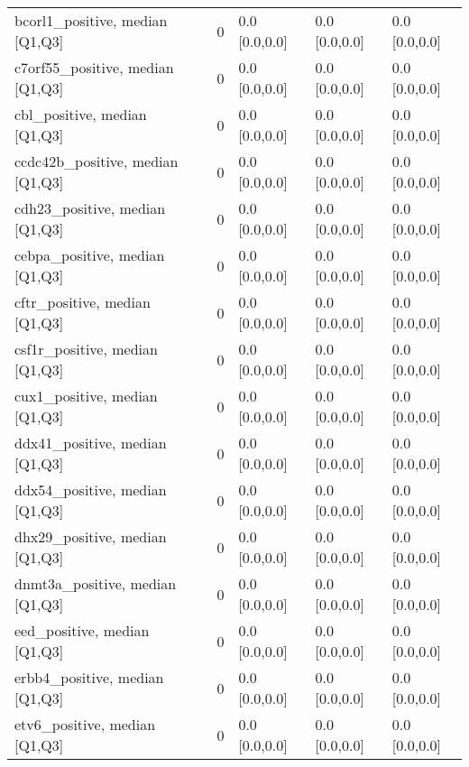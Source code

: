 \begin{tabular}{llllll}
bcorl1\_positive, median [Q1,Q3] &     &                    0 &       0.0 [0.0,0.0] &       0.0 [0.0,0.0] &     0.0 [0.0,0.0] \\
c7orf55\_positive, median [Q1,Q3] &     &                    0 &       0.0 [0.0,0.0] &       0.0 [0.0,0.0] &     0.0 [0.0,0.0] \\
cbl\_positive, median [Q1,Q3] &     &                    0 &       0.0 [0.0,0.0] &       0.0 [0.0,0.0] &     0.0 [0.0,0.0] \\
ccdc42b\_positive, median [Q1,Q3] &     &                    0 &       0.0 [0.0,0.0] &       0.0 [0.0,0.0] &     0.0 [0.0,0.0] \\
cdh23\_positive, median [Q1,Q3] &     &                    0 &       0.0 [0.0,0.0] &       0.0 [0.0,0.0] &     0.0 [0.0,0.0] \\
cebpa\_positive, median [Q1,Q3] &     &                    0 &       0.0 [0.0,0.0] &       0.0 [0.0,0.0] &     0.0 [0.0,0.0] \\
cftr\_positive, median [Q1,Q3] &     &                    0 &       0.0 [0.0,0.0] &       0.0 [0.0,0.0] &     0.0 [0.0,0.0] \\
csf1r\_positive, median [Q1,Q3] &     &                    0 &       0.0 [0.0,0.0] &       0.0 [0.0,0.0] &     0.0 [0.0,0.0] \\
cux1\_positive, median [Q1,Q3] &     &                    0 &       0.0 [0.0,0.0] &       0.0 [0.0,0.0] &     0.0 [0.0,0.0] \\
ddx41\_positive, median [Q1,Q3] &     &                    0 &       0.0 [0.0,0.0] &       0.0 [0.0,0.0] &     0.0 [0.0,0.0] \\
ddx54\_positive, median [Q1,Q3] &     &                    0 &       0.0 [0.0,0.0] &       0.0 [0.0,0.0] &     0.0 [0.0,0.0] \\
dhx29\_positive, median [Q1,Q3] &     &                    0 &       0.0 [0.0,0.0] &       0.0 [0.0,0.0] &     0.0 [0.0,0.0] \\
dnmt3a\_positive, median [Q1,Q3] &     &                    0 &       0.0 [0.0,0.0] &       0.0 [0.0,0.0] &     0.0 [0.0,0.0] \\
eed\_positive, median [Q1,Q3] &     &                    0 &       0.0 [0.0,0.0] &       0.0 [0.0,0.0] &     0.0 [0.0,0.0] \\
erbb4\_positive, median [Q1,Q3] &     &                    0 &       0.0 [0.0,0.0] &       0.0 [0.0,0.0] &     0.0 [0.0,0.0] \\
etv6\_positive, median [Q1,Q3] &     &                    0 &       0.0 [0.0,0.0] &       0.0 [0.0,0.0] &     0.0 [0.0,0.0] \\

\end{tabular}
